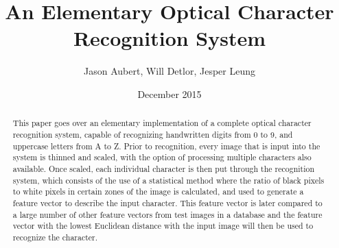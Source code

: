 \documentclass{article}
\begin{document}
\title{An Elementary Optical Character Recognition System}
\author{Jason Aubert, Will Detlor, Jesper Leung}
\date{December 2015}
\begin{titlepage}
\maketitle
\end{titlepage}



\maketitle

\begin{abstract}
\justify
This paper goes over an elementary implementation of a complete optical character recognition system, capable of recognizing handwritten digits from 0 to 9, and uppercase letters from A to Z. Prior to recognition, every image that is input into the system is thinned and scaled, with the option of processing multiple characters also available. Once scaled, each individual character is then put through the recognition system, which consists of the use of a statistical method where the ratio of black pixels to white pixels in certain zones of the image is calculated, and used to generate a feature vector to describe the input character. This feature vector is later compared to a large number of other feature vectors from test images in a database and the feature vector with the lowest Euclidean distance with the input image will then be used to recognize the character.
\end{abstract}
\end{document}
